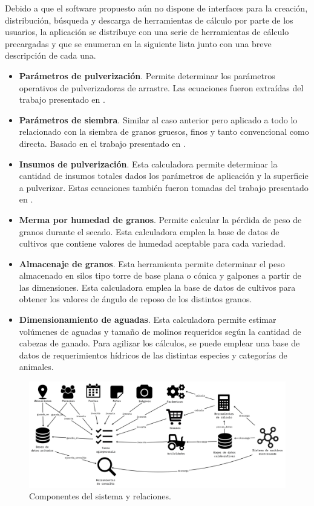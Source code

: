 Debido a que el software propuesto aún no dispone de interfaces para la creación, distribución, búsqueda y descarga de herramientas de cálculo por parte de los usuarios, la aplicación se distribuye con una serie de herramientas de cálculo precargadas y que se enumeran en la siguiente lista junto con una breve descripción de cada una.

\begin{itemize}
    \item \textbf{Parámetros de pulverización}. Permite determinar los parámetros operativos de pulverizadoras de arrastre. Las ecuaciones fueron extraídas del trabajo presentado en \cite{criollo}.
    \item \textbf{Parámetros de siembra}. Similar al caso anterior pero aplicado a todo lo relacionado con la siembra de granos gruesos, finos y tanto convencional como directa. Basado en el trabajo presentado en \cite{campero}.
    \item \textbf{Insumos de pulverización}. Esta calculadora permite determinar la cantidad de insumos totales dados los parámetros de aplicación y la superficie a pulverizar. Estas ecuaciones también fueron tomadas del trabajo presentado en \cite{criollo}.
    \item \textbf{Merma por humedad de granos}. Permite calcular la pérdida de peso de granos durante el secado. Esta calculadora emplea la base de datos de cultivos que contiene valores de humedad aceptable para cada variedad.
    \item \textbf{Almacenaje de granos}. Esta herramienta permite determinar el peso almacenado en silos tipo torre de base plana o cónica y galpones a partir de las dimensiones. Esta calculadora emplea la base de datos de cultivos para obtener los valores de ángulo de reposo de los distintos granos.
    \item \textbf{Dimensionamiento de aguadas}. Esta calculadora permite estimar volúmenes de aguadas y tamaño de molinos requeridos según la cantidad de cabezas de ganado. Para agilizar los cálculos, se puede emplear una base de datos de requerimientos hídricos de las distintas especies y categorías de animales.
\end{itemize}

\begin{figure}[t]
    \centering
    \includegraphics[width=\textwidth]{imagenes/ontologia2_lowres.png}
    \caption{Componentes del sistema y relaciones.} \label{fig:ontologia}
\end{figure}

